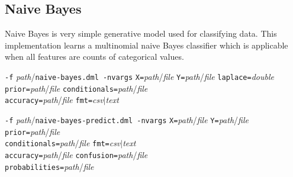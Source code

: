 \subsection{Naive Bayes}
\label{naive_bayes}


Naive Bayes is very simple generative model used for classifying data. 
This implementation learns a multinomial naive Bayes classifier which
is applicable when all features are counts of categorical values.
\\


\begin{tabbing}
\texttt{-f} \textit{path}/\texttt{naive-bayes.dml -nvargs} 
\=\texttt{X=}\textit{path}/\textit{file} 
  \texttt{Y=}\textit{path}/\textit{file} 
  \texttt{laplace=}\textit{double}\\
\>\texttt{prior=}\textit{path}/\textit{file}
  \texttt{conditionals=}\textit{path}/\textit{file}\\
\>\texttt{accuracy=}\textit{path}/\textit{file}
  \texttt{fmt=}\textit{csv}$\vert$\textit{text}
\end{tabbing}

\begin{tabbing}
\texttt{-f} \textit{path}/\texttt{naive-bayes-predict.dml -nvargs} 
\=\texttt{X=}\textit{path}/\textit{file} 
  \texttt{Y=}\textit{path}/\textit{file} 
  \texttt{prior=}\textit{path}/\textit{file}\\
\>\texttt{conditionals=}\textit{path}/\textit{file}
  \texttt{fmt=}\textit{csv}$\vert$\textit{text}\\
\>\texttt{accuracy=}\textit{path}/\textit{file}
  \texttt{confusion=}\textit{path}/\textit{file}\\
\>\texttt{probabilities=}\textit{path}/\textit{file}
\end{tabbing}


